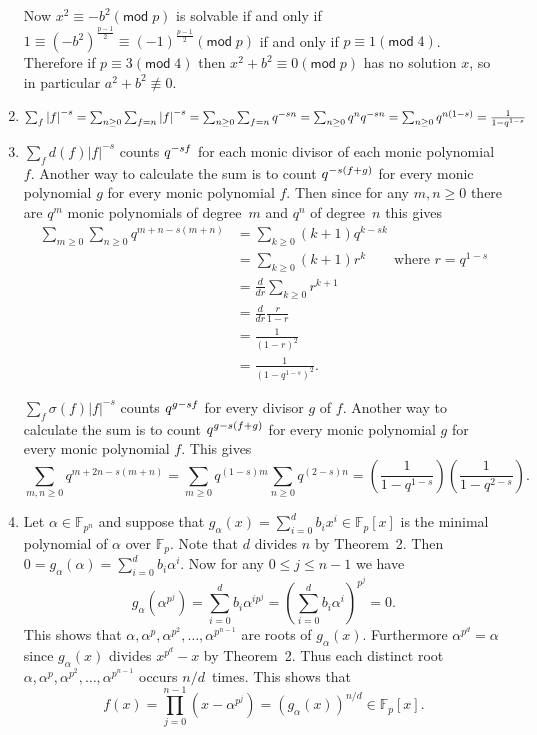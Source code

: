 \documentclass[12pt]{article}
\renewcommand{\pmod}[1]{\left(\mathsf{mod}\;#1\right)}
\let\deg\relax\DeclareMathOperator{\deg}{\mathsf{deg}}
\begin{document}
\begin{enumerate}
Now $x^2\equiv -b^2\pmod{p}$ is solvable
if and only if $1\equiv\left(-b^2\right)^{\frac{p-1}{2}}
\equiv\left(-1\right)^{\frac{p-1}{2}}\pmod{p}$
if and only if $p\equiv 1\pmod{4}$.
Therefore if $p\equiv 3\pmod{4}$ then $x^2+b^2\equiv 0\pmod{p}$
has no solution $x$, so in particular $a^2+b^2\not\equiv 0$.

\item %
$\sum_f\left|f\right|^{-s}
=\sum_{n\ge 0}\sum_{\deg{f}=n}\left|f\right|^{-s}
=\sum_{n\ge 0}\sum_{\deg{f}=n}q^{-sn}
=\sum_{n\ge 0}q^{n}q^{-sn}
=\sum_{n\ge 0}q^{n\left(1-s\right)}
=\frac{1}{1-q^{1-s}}$

\item %
$\sum_fd\left(f\right)\left|f\right|^{-s}$
counts $q^{-s\deg{f}}$ for each monic divisor of each monic polynomial $f$.
Another way to calculate the sum is to count
$q^{-s\left(\deg{f}+\deg{g}\right)}$ for every monic polynomial $g$
for every monic polynomial $f$. Then since for any $m,n\ge 0$
there are $q^m$ monic polynomials of degree~$m$
and $q^n$ of degree~$n$ this gives
\begin{align*}
\sum_{m\ge 0}\sum_{n\ge 0}q^{m+n-s\left(m+n\right)}
&=\sum_{k\ge 0}\left(k+1\right)q^{k-sk}\\
&=\sum_{k\ge 0}\left(k+1\right)r^k\qquad\text{where $r=q^{1-s}$}\\
&=\frac{d}{dr}\sum_{k\ge 0}r^{k+1}\\
&=\frac{d}{dr}\frac{r}{1-r}\\
&=\frac{1}{\left(1-r\right)^2}\\
&=\frac{1}{\left(1-q^{1-s}\right)^2}.
\end{align*}

$\sum_f\sigma\left(f\right)\left|f\right|^{-s}$
counts $q^{\deg{g}-s\deg{f}}$ for every divisor $g$ of $f$.
Another way to calculate the sum is to count
$q^{\deg{g}-s\left(\deg{f}+\deg{g}\right)}$
for every monic polynomial $g$ for every monic polynomial $f$. This gives
\[\sum_{m,n\ge 0}q^{m+2n-s\left(m+n\right)}
=\sum_{m\ge 0}q^{\left(1-s\right)m}
\sum_{n\ge 0}q^{\left(2-s\right)n}
=\left(\frac{1}{1-q^{1-s}}\right)
\left(\frac{1}{1-q^{2-s}}\right).\]

\item\label{OtherRoots} %
Let $\alpha\in\mathbb{F}_{p^n}$
and suppose that $g_\alpha\left(x\right)
=\sum_{i=0}^db_ix^i\in\mathbb{F}_p\left[x\right]$
is the minimal polynomial of $\alpha$ over $\mathbb{F}_p$.
Note that $d$ divides $n$ by Theorem~2.
Then $0=g_\alpha\left(\alpha\right)=\sum_{i=0}^db_i\alpha^i$.
Now for any $0\le j\le n-1$ we have
\[g_\alpha\left(\alpha^{p^j}\right)
=\sum_{i=0}^db_i\alpha^{ip^j}
=\left(\sum_{i=0}^db_i\alpha^i\right)^{p^j}=0.\]
This shows that $\alpha,\alpha^p,\alpha^{p^2},\ldots,\alpha^{p^{n-1}}$
are roots of $g_\alpha\left(x\right)$.
Furthermore $\alpha^{p^d}=\alpha$ since $g_\alpha\left(x\right)$
divides $x^{p^d}-x$ by Theorem~2.
Thus each distinct
root $\alpha,\alpha^p,\alpha^{p^2},\ldots,\alpha^{p^{n-1}}$
occurs $n/d$~times. This shows that
\[f\left(x\right)=\prod_{j=0}^{n-1}\left(x-\alpha^{p^j}\right)
=\left(g_\alpha\left(x\right)\right)^{n/d}
\in\mathbb{F}_p\left[x\right].\]


\end{enumerate}
\end{document}

